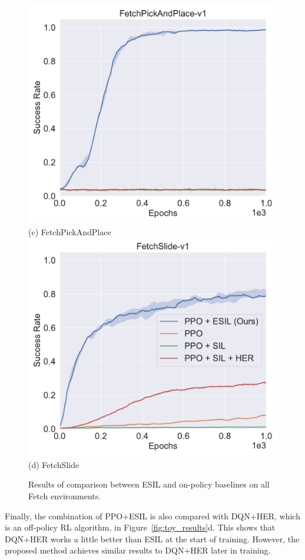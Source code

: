 \begin{figure}[t!]
  \includegraphics[width=\linewidth]{figures/chapter3/pick_baseline.pdf}
  ({c}) FetchPickAndPlace
\endminipage
{}%
  \centering
  \includegraphics[width=\linewidth]{figures/chapter3/slide_baseline.pdf}
  ({d}) FetchSlide
\endminipage\hfill
\caption{Results of comparison between ESIL and on-policy baselines on all Fetch environments.}
\label{fig:baseline_compare}
\end{figure}
Finally, {the combination of PPO+ESIL is also compared with DQN+HER,} which is an off-policy RL algorithm, in Figure~\ref{fig:toy_results}d. This shows that DQN+HER works a little better than ESIL at the {start of training}. However, the proposed method achieves similar results to DQN+HER later in training.

